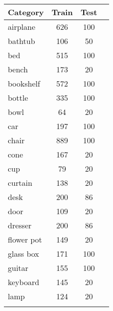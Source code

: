 \begin{table}[]
	\centering
	\begin{tabular}[t]{lccl}
		\hline
		\textbf{Category} & \textbf{Train} & \textbf{Test} & \hspace{4pt} \\ \hline
		airplane          & 626            & 100           &                \\
		bathtub           & 106            & 50            &                \\
		bed               & 515            & 100           &                \\
		bench             & 173            & 20            &                \\
		bookshelf         & 572            & 100           &                \\
		bottle            & 335            & 100           &                \\
		bowl              & 64             & 20            &                \\
		car               & 197            & 100           &                \\
		chair             & 889            & 100           &                \\
		cone              & 167            & 20            &                \\
		cup               & 79             & 20            &                \\
		curtain           & 138            & 20            &                \\
		desk              & 200            & 86            &                \\
		door              & 109            & 20            &                \\
		dresser           & 200            & 86            &                \\
		flower pot        & 149            & 20            &                \\
		glass box         & 171            & 100           &                \\
		guitar            & 155            & 100           &                \\
		keyboard          & 145            & 20            &                \\
		lamp              & 124            & 20            &                \\
		                  &                &               &                \\ \hline

\end{tabular}
\end{table}
